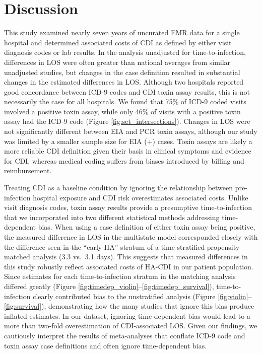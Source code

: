\section{Discussion}

This study examined nearly seven years of uncurated EMR data for a single hospital and determined associated costs of CDI as defined by either visit diagnosis codes or lab results. In the analysis unadjusted for time-to-infection, differences in LOS were often greater than national averages from similar unadjusted studies,\autocite{Gabriel2014,Zhang2016,Zimlichman2013} but changes in the case definition resulted in substantial changes in the estimated differences in LOS. Although two hospitals reported good concordance between ICD-9 codes and CDI toxin assay results,\autocite{Dubberke2006,Scheurer2007} this is not necessarily the case for all hospitals. We found that 75\% of ICD-9 coded visits involved a positive toxin assay, while only 46\% of visits with a positive toxin assay had the ICD-9 code (Figure \ref{fig:set_intersections}). Changes in LOS were not significantly different between EIA and PCR toxin assays, although our study was limited by a smaller sample size for EIA (+) cases. Toxin assays are likely a more reliable CDI definition given their basis in clinical symptoms and evidence for CDI, whereas medical coding suffers from biases introduced by billing and reimbursement.\autocite{Rhee2015,Romano1994}

Treating CDI as a baseline condition by ignoring the relationship between pre-infection hospital exposure and CDI risk overestimates associated costs.\autocite{Graves2010,Mitchell2014,Stevens2015} Unlike visit diagnosis codes, toxin assay results provide a presumptive time-to-infection that we incorporated into two different statistical methods addressing time-dependent bias. When using a case definition of either toxin assay being positive, the measured difference in LOS in the multistate model corresponded closely with the difference seen in the “early HA” stratum of a time-stratified propensity-matched analysis (3.3 vs.\ 3.1 days). This suggests that measured differences in this study robustly reflect associated costs of HA-CDI in our patient population. Since estimates for each time-to-infection stratum in the matching analysis differed greatly (Figure \ref{fig:timedep_violin}–\ref{fig:timedep_survival}), time-to-infection clearly contributed bias to the unstratified analysis (Figure \ref{fig:violin}–\ref{fig:survival}), demonstrating how the many studies that ignore this bias\autocite{Gabriel2014,Zhang2016,Zimlichman2013} produce inflated estimates. In our dataset, ignoring time-dependent bias would lead to a more than two-fold overestimation of CDI-associated LOS. Given our findings, we cautiously interpret the results of meta-analyses that conflate ICD-9 code and toxin assay case definitions and often ignore time-dependent bias.\autocite{Gabriel2014,Ghantoji2010,Zhang2016}  


